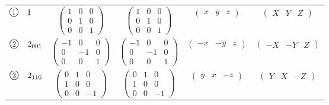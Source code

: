 \documentclass[fleqn,10pt,landscape]{jsarticle}
\begin{document}
\begin{center}
\begin{longtable}{lcccc}
$ {\ooalign{\hfil\resizebox{.8\width}{\height}{1}\hfil\crcr\raise.1ex\hbox{\large$\bigcirc$}}}\quad 1 $ & $ \begin{pmatrix} 1 & 0 & 0 \\ 0 & 1 & 0 \\ 0 & 0 & 1 \end{pmatrix} $ & $ \begin{pmatrix} 1 & 0 & 0 \\ 0 & 1 & 0 \\ 0 & 0 & 1 \end{pmatrix} $ & $ \begin{pmatrix} x & y & z \end{pmatrix} $ & $ \begin{pmatrix} X & Y & Z \end{pmatrix} $ \\
$ {\ooalign{\hfil\resizebox{.8\width}{\height}{2}\hfil\crcr\raise.1ex\hbox{\large$\bigcirc$}}}\quad 2{}_{001} $ & $ \begin{pmatrix} -1 & 0 & 0 \\ 0 & -1 & 0 \\ 0 & 0 & 1 \end{pmatrix} $ & $ \begin{pmatrix} -1 & 0 & 0 \\ 0 & -1 & 0 \\ 0 & 0 & 1 \end{pmatrix} $ & $ \begin{pmatrix} - x & - y & z \end{pmatrix} $ & $ \begin{pmatrix} - X & - Y & Z \end{pmatrix} $ \\
$ {\ooalign{\hfil\resizebox{.8\width}{\height}{3}\hfil\crcr\raise.1ex\hbox{\large$\bigcirc$}}}\quad 2{}_{110} $ & $ \begin{pmatrix} 0 & 1 & 0 \\ 1 & 0 & 0 \\ 0 & 0 & -1 \end{pmatrix} $ & $ \begin{pmatrix} 0 & 1 & 0 \\ 1 & 0 & 0 \\ 0 & 0 & -1 \end{pmatrix} $ & $ \begin{pmatrix} y & x & - z \end{pmatrix} $ & $ \begin{pmatrix} Y & X & - Z \end{pmatrix} $ \\

\end{longtable}
\end{center}
\end{document}
